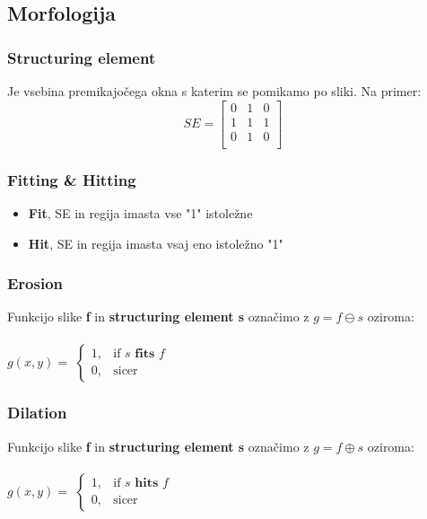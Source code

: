 \documentclass[11pt]{article}
\begin{document}
\subsection{Morfologija}

\subsubsection*{Structuring element}
Je vsebina premikajo\v{c}ega okna s katerim se pomikamo po sliki. Na primer: \\
 \[
   SE =
  \left[ {\begin{array}{ccccccccc}
   0 & 1 & 0 \\
   1 & 1 & 1 \\
   0 & 1 & 0 \\
  \end{array} } \right]
\]

\subsubsection*{Fitting \& Hitting}
\begin{itemize}
\item \textbf{Fit}, SE in regija imasta vse "1" istole\v{z}ne
\item \textbf{Hit}, SE in regija imasta vsaj eno istole\v{z}no "1"
\end{itemize}

\subsubsection*{Erosion}
Funkcijo slike \textbf{f} in \textbf{structuring element s} ozna\v{c}imo z $g = f \ominus s$
oziroma: \\
\\
\indent $g(x, y) = $
$
\begin{cases}
	1, & \text{if } s \textbf{ fits } f \\
	0, & \text{sicer}
\end{cases}
$

\subsubsection*{Dilation}
Funkcijo slike \textbf{f} in \textbf{structuring element s} ozna\v{c}imo z $g = f \oplus s$
oziroma: \\
\\
\indent $g(x, y) = $
$
\begin{cases}
	1, & \text{if } s \textbf{ hits } f \\
	0, & \text{sicer}
\end{cases}
$
\end{document}
